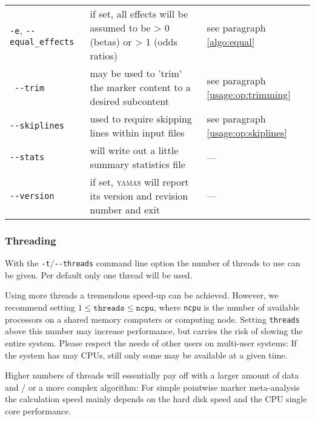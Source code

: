 \begin{table}[H]
\begin{tabular}{p{3cm}p{7cm}p{4cm}}
\verb+-e+, \verb+--equal_effects+ & if set, all effects will be assumed to be > 0 (betas) or > 1 (odds ratios) & see paragraph \ref{algo:equal}\\ \
\verb+--trim+               & may be used to 'trim' the marker content to a desired subcontent & see paragraph \ref{usage:op:trimming}\\
\verb+--skiplines+          & used to require skipping lines within input files & see paragraph
\ref{usage:op:skiplines}\\
\verb+--stats+              & will write out a little summary statistics file & --- \\
\verb+--version+            & if set, \textsc{yamas} will report its version and revision number and exit &  --- \\
\end{tabular}
\end{table}

\subsubsection{Threading}
\label{usage:op:threading}
With the \verb+-t+/\verb+--threads+ command line option the number of threads to use can be given. Per default only one thread will be used.

Using more threads a tremendous speed-up can be achieved. However, we recommend setting $1 \leq \mathtt{threads} \leq \mathtt{ncpu}$, where \texttt{ncpu} is the number of available processors on a shared memory computers or computing node. Setting \texttt{threads} above this number may increase performance, but carries the risk of slowing the entire system. Please respect the needs of other users on multi-user systems: If the system has may CPUs, still only some may be available at a given time.

\alert{Higher numbers of threads will essentially pay off with a larger amount of data and / or a more complex algorithm: For simple pointwise marker meta-analysis the calculation speed mainly depends on the hard disk speed and the CPU single core performance.}

